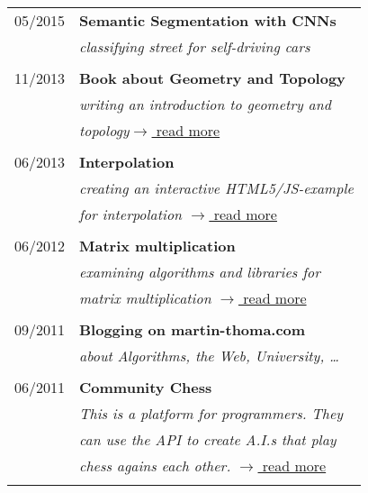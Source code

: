 \documentclass[a4paper,10pt]{article} %
\begin{document}
{\begin{minipage}[t]{0.44\textwidth}
\begin{tabular}{rl}
05/2015  & \textbf{Semantic Segmentation with CNNs}\\
& \textit{classifying street for self-driving cars}\\ \\

11/2013  & \textbf{Book about Geometry and Topology}\\
& \textit{writing an introduction to geometry and}\\
& \textit{topology}\hfill \href{http://martin-thoma.com/geotopo/}{$\rightarrow$ read more}\\ \\

06/2013	 & \textbf{Interpolation}\\
& \textit{creating an interactive HTML5/JS-example}\\
& \textit{for interpolation} \hfill \href{http://martin-thoma.com/polynomial-interpolation/}{$\rightarrow$ read more} \\\\

06/2012	 & \textbf{Matrix multiplication}\\
& \textit{examining algorithms and libraries for}\\
& \textit{matrix multiplication} \hfill \href{http://martin-thoma.com/matrix-multiplication-python-java-cpp/}{$\rightarrow$ read more}\\\\

09/2011	 & \textbf{Blogging on martin-thoma.com}\\
& \textit{about Algorithms, the Web, University, \dots}\\ \\


06/2011	 & \textbf{Community Chess}\\
& \textit{This is a platform for programmers. They}\\
& \textit{can use the API to create A.I.s that play}\\
& \textit{chess agains each other. } \hfill \href{https://github.com/MartinThoma/community-chess}{$\rightarrow$ read more}\\\\
\end{tabular}\\[10pt]


\end{minipage}}
\end{document}
